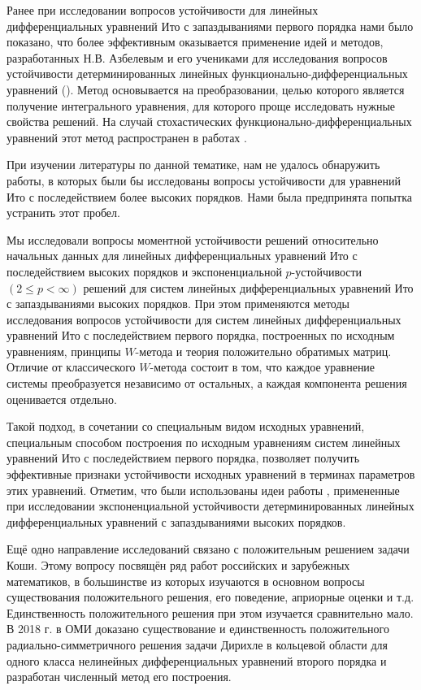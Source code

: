 Ранее при исследовании вопросов устойчивости для линейных дифференциальных уравнений Ито с запаздываниями первого порядка нами было показано, что 
более эффективным оказывается применение идей и методов, разработанных Н.В. Азбелевым и его учениками для исследования вопросов устойчивости детерминированных линейных функционально-дифференциальных уравнений (\cite{kri-bib-5, kri-bib-6, kri-bib-7, kri-bib-8}).
%
Метод основывается на преобразовании, целью которого является получение интегрального уравнения, для которого проще исследовать нужные свойства решений.
На случай стохастических функционально-дифференциальных уравнений этот метод распространен в работах \cite{kri-bib-9, kri-bib-10, kri-bib-11, kri-bib-12, kri-bib-13, kri-bib-14, kri-bib-15}.

При изучении литературы по данной тематике, нам не удалось обнаружить работы, в которых были бы исследованы вопросы устойчивости для уравнений Ито с последействием более высоких порядков.
Нами была предпринята попытка устранить этот пробел. 

Мы исследовали вопросы 
моментной устойчивости решений относительно начальных данных для линейных дифференциальных уравнений Ито с последействием высоких порядков
и
экспоненциальной $p$-устойчивости $(2 \le p < \infty)$ решений для систем линейных дифференциальных уравнений Ито с запаздываниями высоких порядков. 
При этом применяются методы исследования вопросов устойчивости для систем линейных дифференциальных уравнений Ито с последействием первого порядка, построенных по исходным уравнениям, принципы  $W$-метода и теория положительно обратимых матриц.
Отличие от классического $W$-метода состоит в том, что каждое уравнение системы преобразуется независимо от остальных, а каждая компонента решения оценивается отдельно.

Такой подход, в сочетании со специальным видом исходных уравнений, специальным способом построения по исходным уравнениям систем линейных уравнений Ито с последействием первого порядка, позволяет получить эффективные признаки устойчивости исходных уравнений в терминах параметров этих уравнений.
Отметим, что были использованы идеи работы \cite{kri-bib-16}, примененные при исследовании экспоненциальной устойчивости детерминированных линейных дифференциальных уравнений с запаздываниями высоких порядков.



Ещё одно направление исследований связано с положительным решением задачи Коши. Этому вопросу посвящён ряд
работ российских и зарубежных математиков, в большинстве из которых изучаются в основном
вопросы существования положительного решения, его поведение,
априорные оценки и т.д.
Единственность положительного решения при этом изучается сравнительно мало.
В 2018 г. в ОМИ доказано существование и единственность положительного радиально-симметричного решения задачи Дирихле в кольцевой
области для одного класса нелинейных дифференциальных уравнений второго порядка и разработан численный метод его построения.

